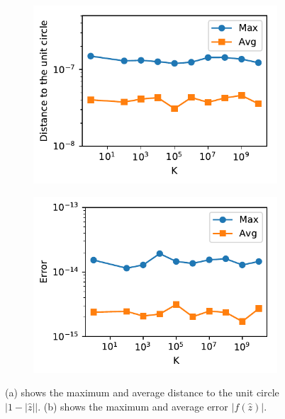 \begin{figure}[!htb]
	
	\begin{subfigure}{.5\textwidth}
		\centering

		\includegraphics[scale=.8]{figures/e3p_known_sols2}
		\caption{}
		\label{fig:e3p_known_sols2}
	\end{subfigure}
	\begin{subfigure}{.5\textwidth}
	\centering
	
	\includegraphics[scale=.8]{figures/e3p_known_sols1}
	\caption{}
	\label{fig:e3p_known_sols1}
	\end{subfigure}
\caption{(a) shows the maximum and average distance to the unit circle $|1-|\hat{z}||$. (b) shows the maximum and average error $|f(\hat{z})|$.}
\end{figure}

